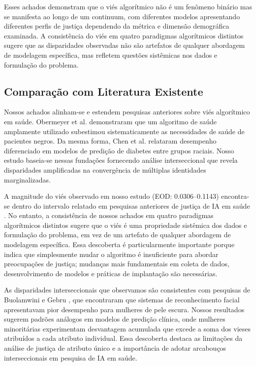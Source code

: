 Esses achados demonstram que o viés algorítmico não é um fenômeno binário 
mas se manifesta ao longo de um continuum, com diferentes modelos 
apresentando diferentes perfis de justiça dependendo da métrica e dimensão 
demográfica examinada. A consistência do viés em quatro paradigmas 
algorítmicos distintos sugere que as disparidades observadas não são 
artefatos de qualquer abordagem de modelagem específica, mas refletem 
questões sistêmicas nos dados e formulação do problema.

\subsection{Comparação com Literatura Existente}

Nossos achados alinham-se e estendem pesquisas anteriores sobre viés 
algorítmico em saúde. Obermeyer et al. \cite{obermeyer2019} demonstraram 
que um algoritmo de saúde amplamente utilizado subestimou sistematicamente 
as necessidades de saúde de pacientes negros. Da mesma forma, Chen et al. 
\cite{chen2019} relataram desempenho diferenciado em modelos de predição 
de diabetes entre grupos raciais. Nosso estudo baseia-se nessas fundações 
fornecendo análise interseccional que revela disparidades amplificadas 
na convergência de múltiplas identidades marginalizadas.

A magnitude do viés observado em nosso estudo (EOD: 0.0306--0.1143) 
encontra-se dentro do intervalo relatado em pesquisas anteriores de 
justiça de IA em saúde \cite{mehrabi2021}. No entanto, a consistência 
de nossos achados em quatro paradigmas algorítmicos distintos sugere 
que o viés é uma propriedade sistêmica dos dados e formulação do 
problema, em vez de um artefato de qualquer abordagem de modelagem 
específica. Essa descoberta é particularmente importante porque indica 
que simplesmente mudar o algoritmo é insuficiente para abordar 
preocupações de justiça; mudanças mais fundamentais em coleta de dados, 
desenvolvimento de modelos e práticas de implantação são necessárias.

As disparidades interseccionais que observamos são consistentes com 
pesquisas de Buolamwini e Gebru \cite{buolamwini2018}, que encontraram 
que sistemas de reconhecimento facial apresentavam pior desempenho para 
mulheres de pele escura. Nossos resultados sugerem padrões análogos em 
modelos de predição clínica, onde mulheres minoritárias experimentam 
desvantagem acumulada que excede a soma dos vieses atribuídos a cada 
atributo individual. Essa descoberta destaca as limitações da análise 
de justiça de atributo único e a importância de adotar arcabouços 
interseccionais em pesquisa de IA em saúde.

